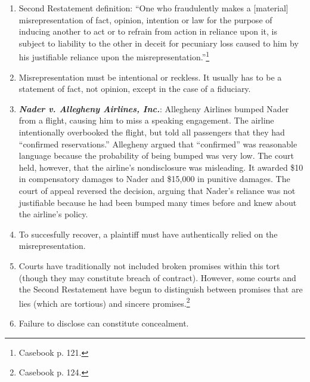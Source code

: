 \begin{enumerate}
    \item Second Restatement definition: ``One who fraudulently makes a 
    [material] misrepresentation of fact, opinion, intention or law for the 
    purpose of inducing another to act or to refrain from action in reliance 
    upon it, is subject to liability to the other in deceit for pecuniary loss 
    caused to him by his justifiable reliance upon the 
    misrepresentation.''\footnote{Casebook p. 121.}
    \item Misrepresentation must be intentional or reckless. It usually has to 
    be a statement of fact, not opinion, except in the case of a fiduciary. 
    \item \textbf{\emph{Nader v. Allegheny Airlines, Inc.}}: Allegheny 
    Airlines bumped Nader from a flight, causing him to miss a speaking 
    engagement. The airline intentionally overbooked the flight, but told all 
    passengers that they had ``confirmed reservations.'' Allegheny argued that 
    ``confirmed'' was reasonable language because the probability of being 
    bumped was very low. The court held, however, that the airline's 
    nondisclosure was misleading. It awarded \$10 in compensatory damages to 
    Nader and \$15,000 in punitive damages. The court of appeal reversed the 
    decision, arguing that Nader's reliance was not justifiable because he had 
    been bumped many times before and knew about the airline's policy.
    \item To succesfully recover, a plaintiff must have authentically relied 
    on the misrepresentation.
    \item Courts have traditionally not included broken promises within this 
    tort (though they may constitute breach of contract). However, some courts 
    and the Second Restatement have begun to distinguish between promises that 
    are lies (which are tortious) and sincere promises.\footnote{Casebook p. 
    124.}
    \item Failure to disclose can constitute concealment.
\end{enumerate}


